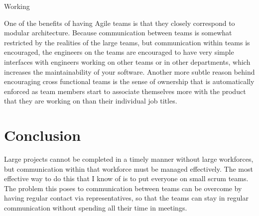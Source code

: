 \documentclass[sigplan,screen]{acmart}
\begin{document}
Working 

One of the benefits of having Agile teams is that they closely correspond to modular architecture. Because communication between teams is somewhat restricted by the realities of the large teams, but communication within teams is encouraged, the engineers on the teams are encouraged to have very simple interfaces with engineers working on other teams or in other departments, which increases the maintainability of your software. Another more subtle reason behind encouraging cross functional teams is the sense of ownership that is automatically enforced as team members start to associate themselves more with the product that they are working on than their individual job titles.\cite{David}

\section{Conclusion}
Large projects cannot be completed in a timely manner without large workforces, but communication within that workforce must be managed effectively. The most effective way to do this that I know of is to put everyone on small scrum teams. The problem this poses to communication between teams can be overcome by having regular contact via representatives, so that the teams can stay in regular communication without spending all their time in meetings.





\end{document}
